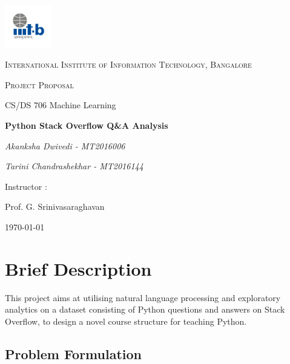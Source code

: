 \documentclass{article}
\begin{document}
\begin{titlepage}
	\centering
	\includegraphics[width=0.15\textwidth]{IIIT-B_logo.jpg}\par\vspace{1cm}
	{\scshape\LARGE International Institute of Information Technology, Bangalore \par}
	\vspace{1cm}
	{\scshape\Large Project Proposal\par}
	{\Large  CS/DS 706 Machine Learning\par}
	\vspace{1.5cm}
	{\huge\bfseries Python Stack Overflow Q\&A Analysis\par}
	\vspace{2cm}
	{\Large\itshape Akanksha Dwivedi - MT2016006\par}
	{\Large\itshape Tarini Chandrashekhar - MT2016144\par}
	\vfill
	Instructor : \par
	Prof. G. Srinivasaraghavan

	\vfill

	{\large \today\par}
\end{titlepage}

\newpage

\tableofcontents

\newpage
\justify

\section{Brief Description}

This project aims at utilising natural language processing and exploratory analytics on a dataset consisting of Python questions and answers on Stack Overflow, to design a novel course structure for teaching Python. 

\smallskip

\bigskip
\subsection{Problem Formulation}
\end{document}
